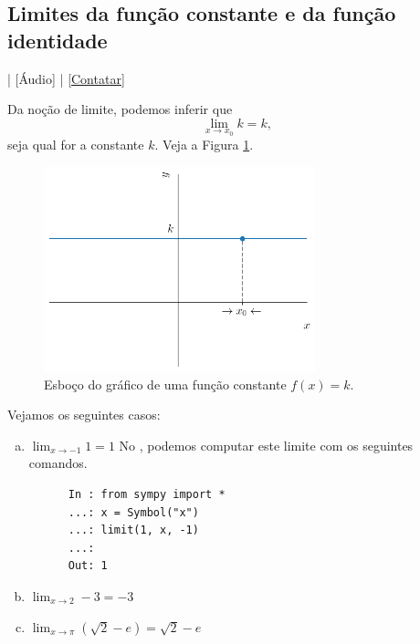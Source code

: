 \subsection{Limites da função constante e da função identidade}\label{sslfc}

\begin{flushright}
  [Vídeo] | [Áudio] | \href{https://phkonzen.github.io/notas/contato.html}{[Contatar]}
\end{flushright}

Da noção de limite, podemos inferir que
\begin{equation}
  \lim_{x\to x_0} k = k,
\end{equation}
seja qual for a constante $k$. Veja a Figura \ref{fig:lim_funk}.

\begin{figure}[H]
  \centering
  \includegraphics[width=0.7\textwidth]{./cap_lim/dados/fig_lim_funk/fig_lim_funk}
  \caption{Esboço do gráfico de uma função constante $f(x) = k$.}
  \label{fig:lim_funk}
\end{figure}

\begin{ex}
  Vejamos os seguintes casos:
  \begin{enumerate}[a)]
  \item $\displaystyle \lim_{x\to -1} 1 = 1$
    \ifispython
    No {\python}, podemos computar este limite com os seguintes comandos.
    \begin{lstlisting}
      In : from sympy import *
      ...: x = Symbol("x")
      ...: limit(1, x, -1)
      ...: 
      Out: 1
    \end{lstlisting}
    \fi
  \item $\displaystyle \lim_{x\to 2} -3 = -3$
  \item $\displaystyle \lim_{x\to \pi} \left(\sqrt{2} - e\right) = \sqrt{2}-e$
  \end{enumerate}
\end{ex}

